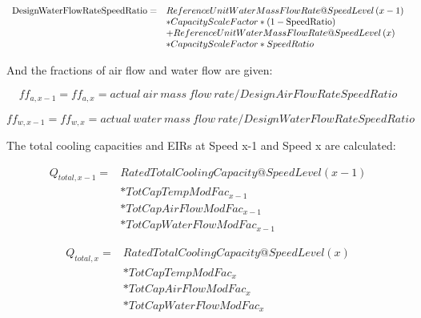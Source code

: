\begin{equation}
  \begin{array}{rl}
    \rm{DesignWaterFlowRateSpeedRatio} =& ReferenceUnitWaterMassFlowRate@SpeedLevel\left( {x - 1} \right) \\
                                        &* CapacityScaleFactor * \left( {1-\rm{SpeedRatio}} \right) \\
                                        &+ ReferenceUnitWaterMassFlowRate@SpeedLevel\left( x \right) \\
                                        &* CapacityScaleFactor * SpeedRatio
  \end{array}
\end{equation}

And the fractions of air flow and water flow are given:

\begin{equation}
ff_{a,x-1} = ff_{a,x} = actual~air~mass~flow~rate/DesignAirFlowRateSpeedRatio
\end{equation}

\begin{equation}
ff_{w,x-1} = ff_{w,x} = actual~water~mass~flow~rate/DesignWaterFlowRateSpeedRatio
\end{equation}

The total cooling capacities and EIRs at Speed x-1 and Speed x are calculated:

\begin{equation}
  \begin{array}{rl}
    {Q_{total,x - 1}} =& RatedTotalCoolingCapacity@SpeedLevel\left( {x - 1} \right) \\
                      &* TotCapTempModFac_{x - 1} \\
                      &* TotCapAirFlowModFac_{x - 1} \\
                      &* TotCapWaterFlowModFac_{x - 1}
  \end{array}
\end{equation}

\begin{equation}
  \begin{array}{rl}
    {Q_{total,x}} =& RatedTotalCoolingCapacity@SpeedLevel\left( x \right) \\
                  &* TotCapTempModFac_x \\
                  &* TotCapAirFlowModFac_x \\
                  &* TotCapWaterFlowModFac_x
  \end{array}
\end{equation}

